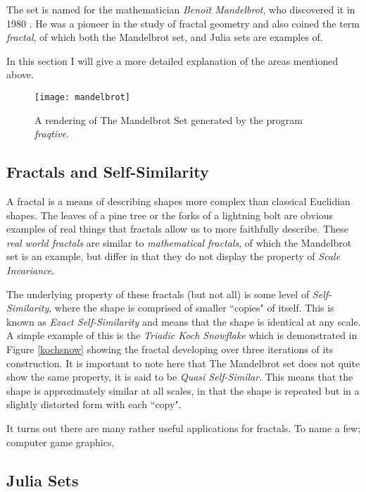 The set is named for the mathematician \textit{Benoit Mandelbrot}, who discovered it in 1980 \cite{fracnature}\cite{fractimg}. He was a pioneer in the study of 
fractal geometry and also coined the term \textit{fractal}, of which both the Mandelbrot set, and Julia sets are examples of. 

In this section I will give a more detailed explanation of the areas mentioned above. 

\begin{figure}[t]
  \caption{A rendering of The Mandelbrot Set generated by the program \textit{fraqtive}.}
  \label{fig:mandelimg}
  \centering
    \texttt{[image: mandelbrot]}
\end{figure}

\subsection*{Fractals and Self-Similarity} 
A fractal is a means of describing shapes more complex than classical Euclidian shapes. The leaves of a pine tree or the forks of a lightning bolt are obvious
examples of real things that fractals allow us to more faithfully describe. These \textit{real world fractals} are similar to \textit{mathematical fractals}, 
of which the Mandelbrot set is an example, but differ in that they do not display the property of \textit{Scale Invariance}. 

The underlying property of these fractals (but not all) is some level of \textit{Self-Similarity}, where the shape is comprised of smaller ``copies" of itself. 
This is known as \textit{Exact Self-Similarity} and means that the shape is identical at any scale.
A simple example of this is the \textit{Triadic Koch Snowflake} which is demonstrated in Figure \ref{kochsnow} showing the fractal developing 
over three iterations of its construction. It is important to note here that The Mandelbrot set does not quite show the same property, it is said to be 
\textit{Quasi Self-Similar}. This means that the shape is approximately similar at all scales, in that the shape is repeated but in a slightly distorted
form with each ``copy".

It turns out there are many rather useful applications for fractals. To name a few; computer game graphics, %

\subsection*{Julia Sets}

